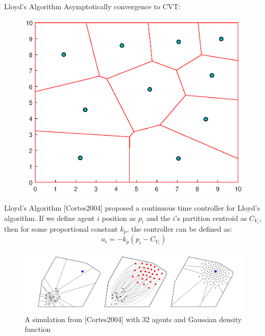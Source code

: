 \documentclass[t]{beamer}
\begin{document}
\begin{frame}[label=lloydsalg5]{Lloyd's Algorithm}
Asymptotically convergence to CVT:
\begin{figure}
\centering
\includegraphics[scale=0.4]{background/cvt-calc-stepn.eps}
\end{figure}
\end{frame}
\begin{frame}[label=lloydsalg6]{Lloyd's Algorithm}
[Cortes2004] proposed a continuous time controller for Lloyd's algorithm. If we define agent $i$ position as $p_i$ and the $i$'s partition centroid as $C_{V_{i}}$, then for some proportional constant $k_{p}$, the controller can be defined as:
\begin{equation*} \label{Lloyds contoller}
u_{i} = -k_{p}\left( p_i - C_{V_{i}} \right)
\end{equation*}

\begin{figure}[b]
\centering
\includegraphics[scale=0.3]{background/Lloyds-alg-from-cortes.png}
\caption{A simulation from [Cortes2004] with 32 agents and Gaussian density function}
\end{figure}
\end{frame}
\end{document}
